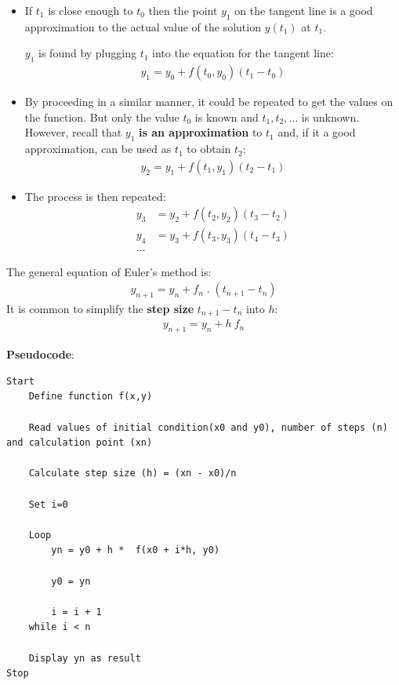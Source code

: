 \documentclass[10pt,a4paper]{article}
\begin{document}
\begin{itemize}
    \item If $t_1$ is close enough to $t_0$ then the point $y_1$ on the tangent line is a good
    approximation to the actual value of the solution $y(t_1)$ at $t_1$.
    
    $y_1$ is found by plugging $t_1$ into the equation for the tangent line:
    \begin{align*}
        y_1=y_0+f(t_0,y_0)(t_1-t_0)
    \end{align*}

    \item By proceeding in a similar manner, it could be repeated to get the values on the function.
    But only the value $t_0$ is known and $t_1, t_2, \dots$ is unknown. However, recall that $y_1$
    \textbf{is an approximation} to $t_1$ and, if it a good approximation, can be used as $t_1$ to
    obtain $t_2$:
    \begin{align*}
        y_2=y_1+f(t_1,y_1)(t_2-t_1)
    \end{align*}

    \item The process is then repeated:
    \begin{align*}
        y_3&=y_2+f(t_2,y_2)(t_3-t_2) \\
        y_4&=y_3+f(t_3,y_3)(t_4-t_3) \\
        \dots
    \end{align*}
\end{itemize}

\begin{tcolorbox}[colback=white]
The general equation of Euler's method is:
\begin{align*}
    y_{n+1}=y_n+f_n\; . \;(t_{n+1}-t_n)
\end{align*}
It is common to simplify the \textbf{step size} $t_{n+1}-t_n$ into $h$:
\begin{align*}
    y_{n+1}=y_n+h\:f_n
\end{align*}
\end{tcolorbox}

\textbf{Pseudocode}: 
\begin{lstlisting}[caption=Euler's Method: Pseudocode]
Start
    Define function f(x,y)

    Read values of initial condition(x0 and y0), number of steps (n) and calculation point (xn)
   
    Calculate step size (h) = (xn - x0)/n

    Set i=0

    Loop 
        yn = y0 + h *  f(x0 + i*h, y0)
      
        y0 = yn
      
        i = i + 1
    while i < n

    Display yn as result
Stop
\end{lstlisting}
\end{document}
